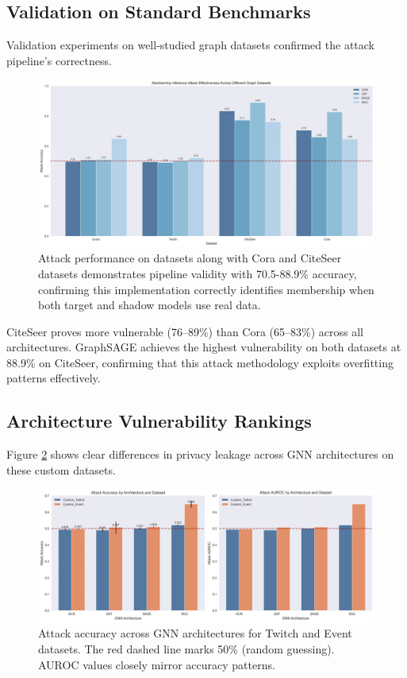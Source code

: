 \documentclass{article}
\begin{document}
\subsection{Validation on Standard Benchmarks}
Validation experiments on well-studied graph datasets confirmed the attack pipeline's correctness.

\begin{figure}[H]
\centering
\includegraphics[width=\textwidth]{../Results/visualizations/comprehensive_datasets_comparison.png}
\caption{Attack performance on datasets along with Cora and CiteSeer datasets demonstrates pipeline validity with 70.5-88.9\% accuracy, confirming this implementation correctly identifies membership when both target and shadow models use real data.}
\label{fig:baseline}
\end{figure}

CiteSeer proves more vulnerable (76--89\%) than Cora (65--83\%) across all architectures. GraphSAGE achieves the highest vulnerability on both datasets at 88.9\% on CiteSeer, confirming that this attack methodology exploits overfitting patterns effectively.

\subsection{Architecture Vulnerability Rankings}
Figure \ref{fig:attack-performance} shows clear differences in privacy leakage across GNN architectures on these custom datasets.

\begin{figure}[H]
\centering
\includegraphics[width=\textwidth]{../Results/visualizations/attack_performance_comparison.png}
\caption{Attack accuracy across GNN architectures for Twitch and Event datasets. The red dashed line marks 50\% (random guessing). AUROC values closely mirror accuracy patterns.}
\label{fig:attack-performance}
\end{figure}
\end{document}
